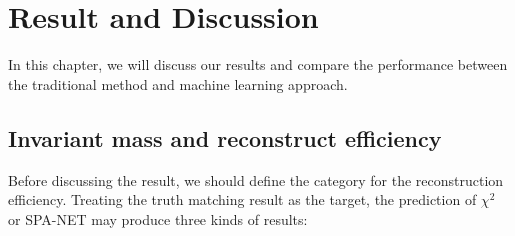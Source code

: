 \chapter{Result and Discussion} \label{Discussion}

In this chapter, we will discuss our results and compare the performance between the traditional method and machine learning approach.

\section{Invariant mass and reconstruct efficiency }\label{sec:inv mass and reco eff}

Before discussing the result, we should define the category for the reconstruction efficiency. Treating the truth matching result as the target, the prediction of $\chi^{2}$ or SPA-NET may produce three kinds of results:

